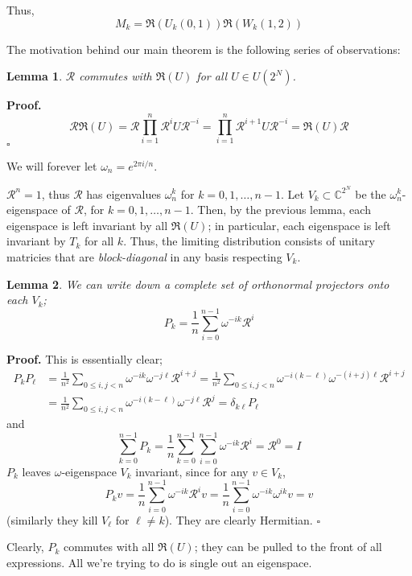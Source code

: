 \documentclass[fleqn,12pt]{article}
\newcommand{\CC}{\mathbb{C}}
\newtheorem{lemma}{Lemma}
\newenvironment*{proof}{\begin{trivlist}\item[]{\bf Proof.}}{\hfill$\square$\end{trivlist}}
\begin{document}
Thus,
\[
    M_k = \mathfrak{R}(U_k(0,1)) \mathfrak{R}(W_k(1,2))
\]

The motivation behind our main theorem is the following series of observations:
\begin{lemma}
    $\mathcal{R}$ commutes with $\mathfrak{R}(U)$ for all $U\in U(2^N)$.
\end{lemma}
\begin{proof}
    \[
        \mathcal{R} \mathfrak{R}(U) = \mathcal{R} \prod_{i = 1}^n \mathcal{R}^i U \mathcal{R}^{-i}
        = \prod_{i = 1}^n \mathcal{R}^{i+1} U \mathcal{R}^{-i} = \mathfrak{R}(U)\mathcal{R}
    \]
\end{proof}
We will forever let $\omega_n = e^{2\pi i / n}$.

$\mathcal{R}^n = 1$, thus $\mathcal{R}$ has eigenvalues $\omega_n^k$ for
$k = 0, 1, \ldots, n-1$.
Let $V_k \subset \CC^{2^N}$ be the $\omega_n^k$-eigenspace of $\mathcal{R}$,
for $k = 0, 1, \ldots, n-1$.
Then, by the previous lemma, each eigenspace is left
invariant by all $\mathfrak{R}(U)$; in particular,
each eigenspace is left invariant by $T_k$ for all $k$.
Thus, the limiting distribution consists of unitary matricies
that are \emph{block-diagonal} in any basis respecting $V_k$.

\begin{lemma}
    We can write down a complete set of orthonormal projectors
    onto each $V_k$;
    \[
        P_k = \frac{1}{n}\sum_{i = 0}^{n-1} \omega^{-ik} \mathcal{R}^i
    \]
\end{lemma}
\begin{proof}
    This is essentially clear;
    \begin{align*}
        P_k P_\ell & = \frac1{n^2} \sum_{0\leq i,j < n} \omega^{-ik} \omega^{-j\ell} \mathcal{R}^{i+j}
        = \frac1{n^2} \sum_{0\leq i,j < n} \omega^{-i(k - \ell)} \omega^{-(i + j)\ell} \mathcal{R}^{i + j}                           \\
                   & = \frac1{n^2} \sum_{0\leq i,j < n} \omega^{-i(k - \ell)} \omega^{-j\ell} \mathcal{R}^j  = \delta_{k\ell} P_\ell
    \end{align*}
    and
    \[
        \sum_{k = 0}^{n-1} P_k = \frac1n \sum_{k = 0}^{n-1} \sum_{i = 0}^{n-1} \omega^{-ik} \mathcal{R}^i
        = \mathcal{R}^0 = I
    \]
    $P_k$ leaves $\omega$-eigenspace $V_k$ invariant, since for any $v\in V_k$,
    \[
        P_k v = \frac{1}{n} \sum_{i = 0}^{n-1} \omega^{-ik} \mathcal{R}^i v
        = \frac{1}{n} \sum_{i = 0}^{n-1} \omega^{-ik} \omega^{ik} v = v
    \]
    (similarly they kill $V_\ell$ for $\ell \neq k$). They are clearly Hermitian.
\end{proof}
Clearly, $P_k$ commutes with all $\mathfrak{R}(U)$; they
can be pulled to the front of all expressions.
All we're trying to do is single out an eigenspace.
\end{document}
